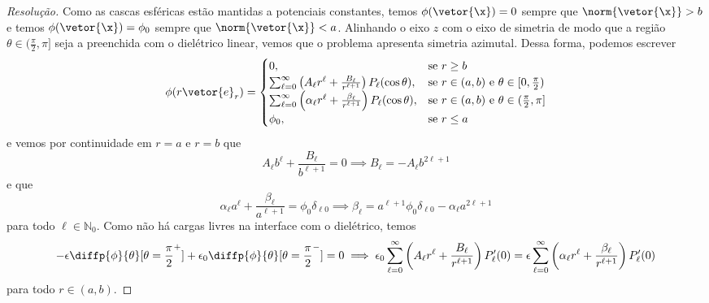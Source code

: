 \begin{proof}[Resolução]
    Como as cascas esféricas estão mantidas a potenciais constantes, temos \(\phi(\vetor{\x}) = 0\) sempre que \(\norm{\vetor{\x}} > b\) e temos \(\phi(\vetor{\x}) = \phi_0\) sempre que \(\norm{\vetor{\x}} < a\). Alinhando o eixo \(z\) com o eixo de simetria de modo que a região \(\theta \in (\frac{\pi}{2}, \pi]\) seja a preenchida com o dielétrico linear, vemos que o problema apresenta simetria azimutal. Dessa forma, podemos escrever
    \begin{equation*}
        \phi(r \vetor{e}_r) = \begin{cases}
            0,&\text{se }r \geq b\\
            \sum_{\ell = 0}^\infty \left(A_\ell r^\ell + \frac{B_\ell}{r^{\ell + 1}}\right)P_\ell(\cos\theta),&\text{se }r \in (a,b)\text{ e }\theta \in [0, \frac{\pi}{2})\\
            \sum_{\ell = 0}^\infty \left(\alpha_\ell r^\ell + \frac{\beta_\ell}{r^{\ell + 1}}\right)P_\ell(\cos\theta),&\text{se }r \in (a,b)\text{ e }\theta \in (\frac{\pi}{2},\pi]\\
            \phi_0,&\text{se }r \leq a
        \end{cases}
    \end{equation*}
    e vemos por continuidade em \(r = a\) e \(r = b\) que
    \begin{equation*}
        A_\ell b^\ell + \frac{B_\ell}{b^{\ell + 1}} = 0 \implies B_\ell = - A_\ell b^{2\ell + 1}
    \end{equation*}
    e que
    \begin{equation*}
        \alpha_\ell a^\ell + \frac{\beta_\ell}{a^{\ell + 1}} = \phi_0 \delta_{\ell 0} \implies \beta_\ell = a^{\ell + 1}\phi_0 \delta_{\ell 0} - \alpha_\ell a^{2\ell + 1}
    \end{equation*}
    para todo \(\ell \in \mathbb{N}_0\). Como não há cargas livres na interface com o dielétrico, temos
    \begin{equation*}
        -\epsilon \diffp{\phi}{\theta}[\theta = \frac{\pi}{2}^+] + \epsilon_0 \diffp{\phi}{\theta}[\theta = \frac{\pi}{2}^-] = 0 \implies \epsilon_0\sum_{\ell = 0}^\infty \left(A_\ell r^\ell + \frac{B_\ell}{r^{\ell + 1}}\right) P_\ell'(0) = \epsilon\sum_{\ell = 0}^\infty \left(\alpha_\ell r^\ell + \frac{\beta_\ell}{r^{\ell + 1}}\right)P_\ell'(0)
    \end{equation*}
    para todo \(r \in (a,b)\).
\end{proof}
